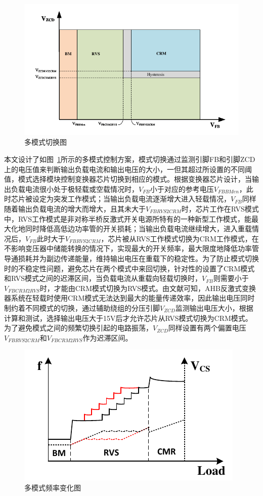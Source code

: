 \begin{figure}[htbp] 
    \centering
    \includegraphics[width=0.8\linewidth]{figures/模式切换1.pdf}
    \caption{多模式切换图}
    \label{fig:模式切换1}
\end{figure}

本文设计了如图~\ref{fig:模式切换1}所示的多模式控制方案，模式切换通过监测引脚FB和引脚ZCD上的电压值来判断输出负载电流和输出电压的大小，一但其超过所设置的不同阈值，模式选择模块控制变换器芯片切换到相应的模式。根据变换器芯片设计，当输出负载电流很小处于极轻载或空载情况时，$V_{FB}$小于对应的参考电压$V_{FBBMen}$，此时芯片被设定为突发工作模式；当输出负载电流逐渐增大进入轻载情况，$V_{FB}$同样随着输出负载电流的增大而增大，且其未大于$V_{FBRVS2CRM}$时，芯片工作在RVS模式中，RVS工作模式是非对称半桥反激式开关电源所特有的一种新型工作模式，能最大化地同时降低高低边功率管的开关损耗；当输出负载电流继续增大，进入重载情况后，$V_{FB}$此时大于$V_{FBRVS2CRM}$，芯片被从RVS工作模式切换为CRM工作模式，在不影响变压器中储能转换的情况下，实现最大的开关频率，最大限度地降低功率管导通损耗并为副边传递能量，维持输出电压在重载下的稳定性。为了防止模式切换时的不稳定性问题，避免芯片在两个模式中来回切换，针对性的设置了CRM模式和RVS模式之间的迟滞区间，当负载电流从重载向轻载切换时，$V_{FB}$则需要小于$V_{FBCRM2RVS}$时，才能由CRM模式切换为RVS模式。由文献可知，AHB反激式变换器系统在轻载时使用CRM模式无法达到最大的能量传递效率，因此输出电压同时制约着不同模式的切换，通过辅助绕组的分压引脚$V_{ZCD}$监测输出电压大小，根据计算和测试，选择输出电压大于15V后才允许芯片从RVS模式切换为CRM模式。为了避免模式之间的频繁切换引起的电路振荡，$V_{ZCD}$同样设置有两个偏置电压$V_{FBRVS2CRM}$和$V_{FBCRM2RVS}$作为迟滞区间。

\begin{figure}[htbp] 
    \centering
    \includegraphics[width=0.8\linewidth]{figures/模式切换2.pdf}
    \caption{多模式频率变化图}
    \label{fig:模式切换2}
\end{figure}

